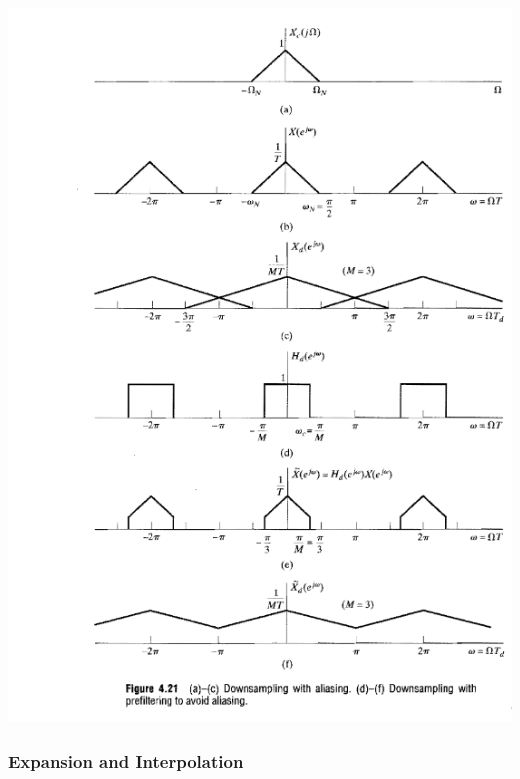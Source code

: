 \documentclass[11pt]{article}
\begin{document}
  \includegraphics[scale=0.7]{graphics/downsampling.png}

  \pagebreak

  \subsubsection{Expansion and Interpolation}
\end{document}
